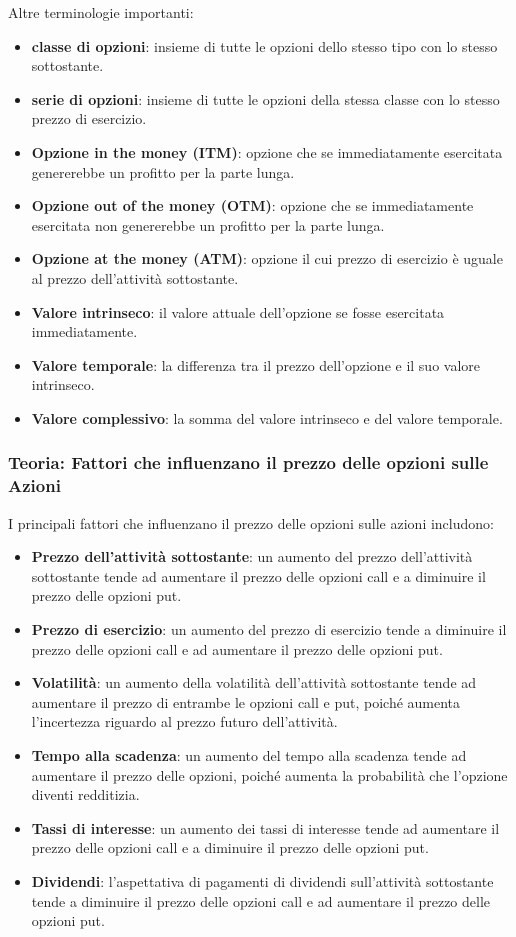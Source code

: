 \documentclass[12pt,a4paper]{report}
\begin{document}
Altre terminologie importanti:
\begin{itemize}
    \item \textbf{classe di opzioni}: insieme di tutte le opzioni dello stesso tipo con lo stesso sottostante.
    \item \textbf{serie di opzioni}: insieme di tutte le opzioni della stessa classe con lo stesso prezzo di esercizio.
    \item \textbf{Opzione in the money (ITM)}: opzione che se immediatamente esercitata genererebbe un profitto per la parte lunga.
    \item \textbf{Opzione out of the money (OTM)}: opzione che se immediatamente esercitata non genererebbe un profitto per la parte lunga.
    \item \textbf{Opzione at the money (ATM)}: opzione il cui prezzo di esercizio è uguale al prezzo dell'attività sottostante.
    \item \textbf{Valore intrinseco}: il valore attuale dell'opzione se fosse esercitata immediatamente.
    \item \textbf{Valore temporale}: la differenza tra il prezzo dell'opzione e il suo valore intrinseco.
    \item \textbf{Valore complessivo}: la somma del valore intrinseco e del valore temporale.
\end{itemize}
\newpage
\subsubsection{Teoria: Fattori che influenzano il prezzo delle opzioni sulle Azioni}

I principali fattori che influenzano il prezzo delle opzioni sulle azioni includono:

\begin{itemize}
    \item \textbf{Prezzo dell'attività sottostante}: un aumento del prezzo dell'attività sottostante tende ad aumentare il prezzo delle opzioni call e a diminuire il prezzo delle opzioni put.
    \item \textbf{Prezzo di esercizio}: un aumento del prezzo di esercizio tende a diminuire il prezzo delle opzioni call e ad aumentare il prezzo delle opzioni put.
    \item \textbf{Volatilità}: un aumento della volatilità dell'attività sottostante tende ad aumentare il prezzo di entrambe le opzioni call e put, poiché aumenta l'incertezza riguardo al prezzo futuro dell'attività.
    \item \textbf{Tempo alla scadenza}: un aumento del tempo alla scadenza tende ad aumentare il prezzo delle opzioni, poiché aumenta la probabilità che l'opzione diventi redditizia.
    \item \textbf{Tassi di interesse}: un aumento dei tassi di interesse tende ad aumentare il prezzo delle opzioni call e a diminuire il prezzo delle opzioni put.
    \item \textbf{Dividendi}: l'aspettativa di pagamenti di dividendi sull'attività sottostante tende a diminuire il prezzo delle opzioni call e ad aumentare il prezzo delle opzioni put.
\end{itemize}
\end{document}
